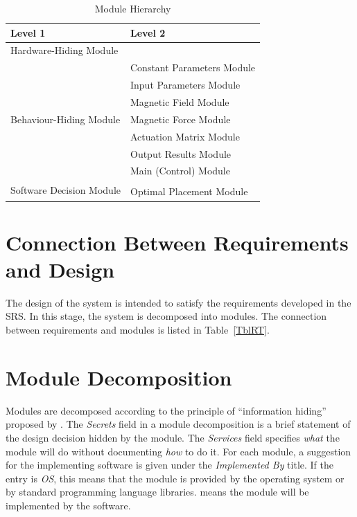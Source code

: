 \documentclass[12pt, titlepage]{article}
\begin{document}
\begin{table}[h!]
\centering
\begin{tabular}{p{} p{}}
\toprule
\textbf{Level 1} & \textbf{Level 2}\\
\midrule

{Hardware-Hiding Module} & ~ \\
\midrule

\multirow{7}{0.3\textwidth}{Behaviour-Hiding Module} & Constant Parameters Module\\
& Input Parameters Module\\
& Magnetic Field Module\\
& Magnetic Force Module\\
& Actuation Matrix Module\\
& Output Results Module\\ 
& Main (Control) Module\\
\midrule

\multirow{3}{0.3\textwidth}{Software Decision Module} & \\
& Optimal Placement Module\\
\bottomrule

\end{tabular}
\caption{Module Hierarchy}
\label{TblMH}
\end{table}

\section{Connection Between Requirements and Design} \label{SecConnection}

The design of the system is intended to satisfy the requirements developed in
the SRS. In this stage, the system is decomposed into modules. The connection
between requirements and modules is listed in Table~\ref{TblRT}.


\section{Module Decomposition} \label{SecMD}

Modules are decomposed according to the principle of ``information hiding''
proposed by \citet{ParnasEtAl1984}. The \emph{Secrets} field in a module
decomposition is a brief statement of the design decision hidden by the
module. The \emph{Services} field specifies \emph{what} the module will do
without documenting \emph{how} to do it. For each module, a suggestion for the
implementing software is given under the \emph{Implemented By} title. If the
entry is \emph{OS}, this means that the module is provided by the operating
system or by standard programming language libraries.  \emph{\progname{}} means the
module will be implemented by the \progname{} software.
\end{document}
